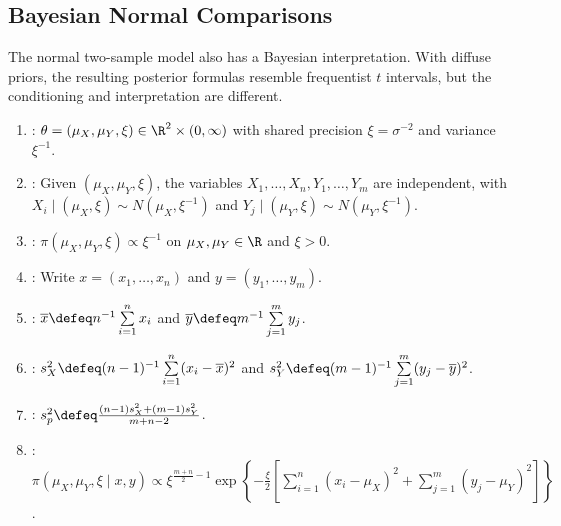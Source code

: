 \subsection{Bayesian Normal Comparisons}

The normal two-sample model also has a Bayesian interpretation.  With diffuse priors, the resulting posterior formulas resemble frequentist $t$ intervals, but the conditioning and interpretation are different.

\begin{definition} \label{def:bayesian-common-variance-two-sample-model} 
\begin{enumerate}[label=(\roman*)]
\setlength{\itemsep}{0pt}
\item {}: $\theta=(\mu_X,\mu_Y,\xi)\in\R^2\times(0,\infty)$ with shared precision $\xi=\sigma^{-2}$ and variance $\xi^{-1}$.
\item {}: Given $(\mu_X,\mu_Y,\xi)$, the variables $X_1,\ldots,X_n,Y_1,\ldots,Y_m$ are independent, with $X_i\mid(\mu_X,\xi)\sim N(\mu_X,\xi^{-1})$ and $Y_j\mid(\mu_Y,\xi)\sim N(\mu_Y,\xi^{-1})$.
\item {}: $\pi(\mu_X,\mu_Y,\xi)\propto \xi^{-1}$ on $\mu_X,\mu_Y\in\R$ and $\xi>0$.
\item {}: Write $x=(x_1,\ldots,x_n)$ and $y=(y_1,\ldots,y_m)$.
\item {}: $\overline{x}\defeq n^{-1}\sum\limits_{i=1}^{n}x_i$ and $\overline{y}\defeq m^{-1}\sum\limits_{j=1}^{m}y_j$.
\item {}: $s_X^2\defeq(n-1)^{-1}\sum\limits_{i=1}^{n}(x_i-\overline{x})^2$ and $s_Y^2\defeq(m-1)^{-1}\sum\limits_{j=1}^{m}(y_j-\overline{y})^2$.
\item {}: $s_p^2\defeq\frac{(n-1)s_X^2+(m-1)s_Y^2}{m+n-2}$.
\item {}: $\pi(\mu_X,\mu_Y,\xi\mid x,y)\propto \xi^{\frac{m+n}{2}-1}\exp\left\{-\frac{\xi}{2}\left[\sum\limits_{i=1}^{n}(x_i-\mu_X)^2+\sum\limits_{j=1}^{m}(y_j-\mu_Y)^2\right]\right\}$.
\end{enumerate}
\end{definition}

